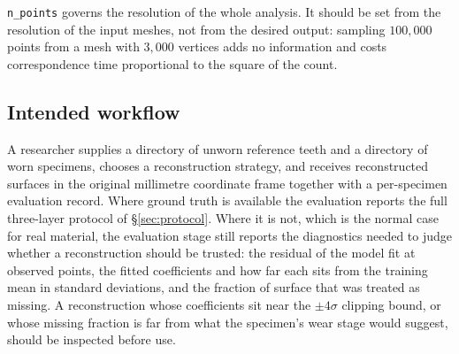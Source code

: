 \documentclass[10pt,a4paper,twocolumn]{article}
\newcommand{\code}[1]{\texttt{#1}}
\begin{document}
\code{n\_points} governs the resolution of the whole analysis. It should be set
from the resolution of the input meshes, not from the desired output: sampling
$100{,}000$ points from a mesh with $3{,}000$ vertices adds no information and
costs correspondence time proportional to the square of the count.

\subsection{Intended workflow}

A researcher supplies a directory of unworn reference teeth and a directory of
worn specimens, chooses a reconstruction strategy, and receives reconstructed
surfaces in the original millimetre coordinate frame together with a per-specimen
evaluation record. Where ground truth is available the evaluation reports the
full three-layer protocol of \S\ref{sec:protocol}. Where it is not, which is
the normal case for real material, the evaluation stage still reports the
diagnostics needed to judge whether a reconstruction should be trusted: the
residual of the model fit at observed points, the fitted coefficients and how far
each sits from the training mean in standard deviations, and the fraction of
surface that was treated as missing. A reconstruction whose coefficients sit near
the $\pm4\sigma$ clipping bound, or whose missing fraction is far from what the
specimen's wear stage would suggest, should be inspected before use.
\end{document}
